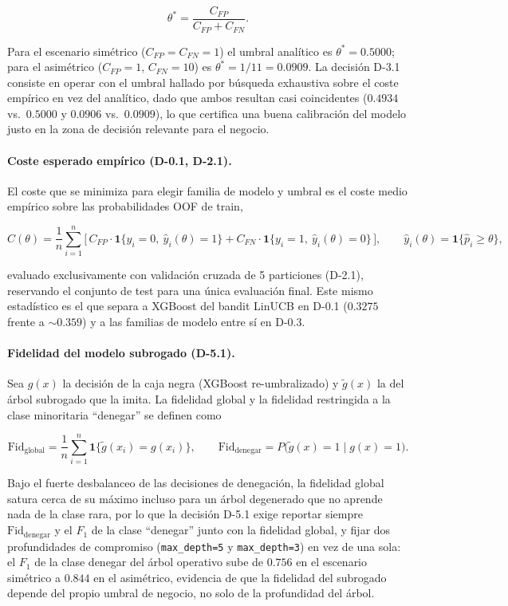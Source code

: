 \documentclass[11pt,a4paper]{article}
\begin{document}
\[
\theta^{*} = \frac{C_{FP}}{C_{FP} + C_{FN}}.
\]

Para el escenario simétrico ($C_{FP}=C_{FN}=1$) el umbral analítico es $\theta^{*}=0.5000$; para el
asimétrico ($C_{FP}=1$, $C_{FN}=10$) es $\theta^{*}=1/11=0.0909$. La decisión D-3.1 consiste en
operar con el umbral hallado por búsqueda exhaustiva sobre el coste empírico en vez del analítico,
dado que ambos resultan casi coincidentes ($0.4934$ vs.\ $0.5000$ y $0.0906$ vs.\ $0.0909$), lo que
certifica una buena calibración del modelo justo en la zona de decisión relevante para el negocio.

\paragraph{Coste esperado empírico (D-0.1, D-2.1).} El coste que se minimiza para elegir familia de
modelo y umbral es el coste medio empírico sobre las probabilidades OOF de train,

\[
\widehat{C}(\theta) = \frac{1}{n}\sum_{i=1}^{n}
\Big[\, C_{FP}\cdot \mathbf{1}\{y_i=0,\ \hat y_i(\theta)=1\}
     + C_{FN}\cdot \mathbf{1}\{y_i=1,\ \hat y_i(\theta)=0\}\, \Big],
\qquad \hat y_i(\theta)=\mathbf{1}\{\hat p_i \geq \theta\},
\]

evaluado exclusivamente con validación cruzada de 5 particiones (D-2.1), reservando el conjunto de
test para una única evaluación final. Este mismo estadístico es el que separa a XGBoost del bandit
LinUCB en D-0.1 ($0.3275$ frente a $\sim 0.359$) y a las familias de modelo entre sí en D-0.3.

\paragraph{Fidelidad del modelo subrogado (D-5.1).} Sea $g(x)$ la decisión de la caja negra
(XGBoost re-umbralizado) y $\tilde g(x)$ la del árbol subrogado que la imita. La fidelidad global y
la fidelidad restringida a la clase minoritaria ``denegar'' se definen como

\[
\mathrm{Fid}_{\text{global}} = \frac{1}{n}\sum_{i=1}^{n}\mathbf{1}\{\tilde g(x_i)=g(x_i)\},
\qquad
\mathrm{Fid}_{\text{denegar}} = P\big(\tilde g(x)=1 \mid g(x)=1\big).
\]

Bajo el fuerte desbalanceo de las decisiones de denegación, la fidelidad global satura cerca de su
máximo incluso para un árbol degenerado que no aprende nada de la clase rara, por lo que la
decisión D-5.1 exige reportar siempre $\mathrm{Fid}_{\text{denegar}}$ y el $F_1$ de la clase
``denegar'' junto con la fidelidad global, y fijar dos profundidades de compromiso
(\texttt{max\_depth=5} y \texttt{max\_depth=3}) en vez de una sola: el $F_1$ de la clase denegar del
árbol operativo sube de $0.756$ en el escenario simétrico a $0.844$ en el asimétrico, evidencia de
que la fidelidad del subrogado depende del propio umbral de negocio, no solo de la profundidad del
árbol.
\end{document}
